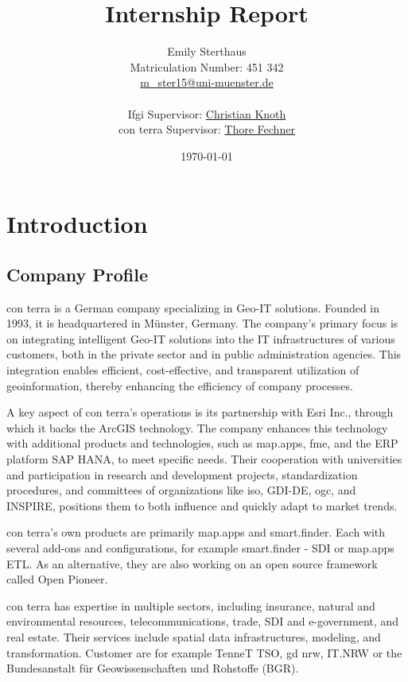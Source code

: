 \documentclass[11pt, titlepage, a4paper]{article}
\title{Internship Report}
\author{Emily Sterthaus \\ Matriculation Number: 451 342 \\ \href{mailto:m_ster15@uni-muenster.de}{m\_ster15@uni-muenster.de}\\ \\
\small Ifgi Supervisor: \href{mailto:christian.knoth@uni-muenster.de}{Christian Knoth}\\ \small con terra Supervisor: \href{mailto:t.fechner@conterra.de}{Thore Fechner}
}
\date{\today}
\begin{document}
\maketitle
\newpage
\tableofcontents
\newpage

\section{Introduction}

\subsection{Company Profile}

con terra is a German company specializing in Geo-IT solutions. Founded in 1993, it is headquartered in Münster, Germany. The company's primary focus is on integrating intelligent Geo-IT solutions into the IT infrastructures of various customers, both in the private sector and in public administration agencies. This integration enables efficient, cost-effective, and transparent utilization of geoinformation, thereby enhancing the efficiency of company processes.

A key aspect of con terra's operations is its partnership with Esri Inc., through which it backs the ArcGIS technology. The company enhances this technology with additional products and technologies, such as map.apps, \gls{fme}, and the ERP platform SAP HANA, to meet specific needs. Their cooperation with universities and participation in research and development projects, standardization procedures, and committees of organizations like \gls{iso}, GDI-DE, \gls{ogc}, and INSPIRE, positions them to both influence and quickly adapt to market trends.

con terra's own products are primarily map.apps and smart.finder. Each with several add-ons and configurations, for example smart.finder - SDI or map.apps ETL. As an alternative, they are also working on an open source framework called Open Pioneer.

con terra has expertise in multiple sectors, including insurance, natural and environmental resources, telecommunications, trade, SDI and e-government, and real estate. Their services include spatial data infrastructures, modeling, and transformation. Customer are for example TenneT TSO,  \gls {gd} \gls{nrw}, IT.NRW or the Bundesanstalt für Geowissenschaften und Rohstoffe  (BGR).
\end{document}
